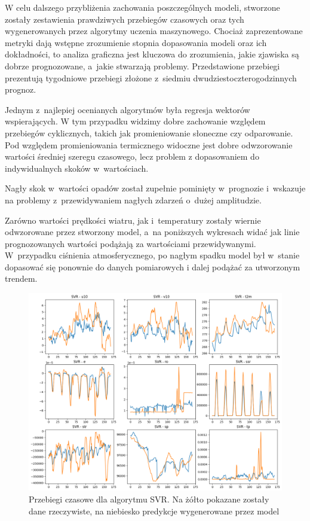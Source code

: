 W celu dalszego przybliżenia zachowania poszczególnych modeli, stworzone zostały
zestawienia prawdziwych przebiegów czasowych oraz tych wygenerowanych przez algorytmy
uczenia maszynowego. Chociaż zaprezentowane metryki dają wstępne zrozumienie
stopnia dopasowania modeli oraz ich dokładności, to analiza graficzna jest kluczowa
do zrozumienia, jakie zjawiska są dobrze prognozowane, a~jakie stwarzają problemy.
Przedstawione przebiegi prezentują tygodniowe przebiegi złożone z~siedmiu 
dwudziestoczterogodzinnych prognoz.

\pagebreak

Jednym z~najlepiej ocenianych algorytmów była regresja wektorów wspierających.
W tym przypadku widzimy dobre zachowanie względem przebiegów cyklicznych, takich jak
promieniowanie słoneczne czy odparowanie. Pod względem promieniowania termicznego
widoczne jest dobre odwzorowanie wartości średniej szeregu czasowego, lecz problem
z dopasowaniem do indywidualnych skoków w~wartościach.

Nagły skok w~wartości opadów został zupełnie pominięty w~prognozie i~wskazuje 
na problemy z~przewidywaniem nagłych zdarzeń o~dużej amplitudzie. 

Zarówno wartości prędkości wiatru, jak i~temperatury zostały wiernie odwzorowane
przez stworzony model, a~na poniższych wykresach widać jak linie prognozowanych wartości
podążają za wartościami przewidywanymi. W~przypadku ciśnienia atmosferycznego,
po nagłym spadku model był w~stanie dopasować się ponownie do danych pomiarowych
i dalej podążać za utworzonym trendem.

\begin{figure}[H]
    \centering
    \includegraphics[width=\textwidth]{images/SVR_week.png}
    \caption[Przebiegi czasowe dla SVR]{Przebiegi czasowe dla algorytmu SVR. Na żółto pokazane zostały dane 
    rzeczywiste, na niebiesko predykcje wygenerowane przez model}
    \label{svr-week}
\end{figure}

